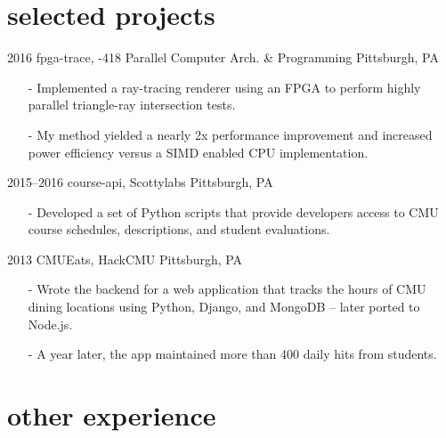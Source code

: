 \documentclass[print]{template/friggeri-cv}
\begin{document}
    \section{selected projects}

    \begin{entrylist}
        \entrys
            {2016}
            {fpga-trace, {-418 Parallel Computer Arch. \& Programming}}
            {Pittsburgh, PA}
            {\begin{itemize}[leftmargin=*]
                \item[-] Implemented a ray-tracing renderer using an FPGA to perform highly parallel triangle-ray intersection tests.
                \item[-] My method yielded a nearly 2x performance improvement and increased power efficiency versus a SIMD enabled CPU implementation.
            \end{itemize}}
        \entrys
            {2015--2016}
            {course-api, {\normalfont Scottylabs}}
            {Pittsburgh, PA}
            {\begin{itemize}[leftmargin=*]
                \item[-] Developed a set of Python scripts that provide developers access to CMU course schedules, descriptions, and student evaluations.
            \end{itemize}}
        \entrys
            {2013}
            {CMUEats, {\normalfont HackCMU}}
            {Pittsburgh, PA}
            {\begin{itemize}[leftmargin=*]
                \item[-] Wrote the backend for a web application that tracks the hours of CMU dining locations using Python, Django, and MongoDB -- later ported to Node.js.
                \item[-] A year later, the app maintained more than 400 daily hits from students.
            \end{itemize}}
    \end{entrylist}

    \section{other experience}
\end{document}
